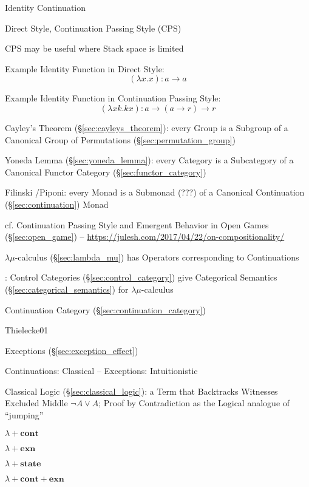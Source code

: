 Identity Continuation


\asterism


Direct Style, Continuation Passing Style (CPS)

CPS may be useful where Stack space is limited

Example Identity Function in Direct Style:
\[
  (\lambda x . x) : a \rightarrow a
\]

Example Identity Function in Continuation Passing Style:
\[
  (\lambda x k.k x) : a \rightarrow (a \rightarrow r) \rightarrow r
\]

Cayley's Theorem (\S\ref{sec:cayleys_theorem}): every Group is a Subgroup of a
Canonical Group of Permutations (\S\ref{sec:permutation_group})

Yoneda Lemma (\S\ref{sec:yoneda_lemma}): every Category is a Subcategory of a
Canonical Functor Category (\S\ref{sec:functor_category})

Filinski \cite{filinski99}/Piponi: every Monad is a Submonad (???) of a
Canonical Continuation (\S\ref{sec:continuation}) Monad

cf. Continuation Passing Style and Emergent Behavior in Open Games
(\S\ref{sec:open_game}) --
\url{https://julesh.com/2017/04/22/on-compositionality/}


\asterism


$\lambda\mu$-calculus (\S\ref{sec:lambda_mu}) has Operators corresponding to
Continuations

\cite{selinger01}: Control Categories (\S\ref{sec:control_category}) give
Categorical Semantics (\S\ref{sec:categorical_semantics}) for
$\lambda\mu$-calculus

Continuation Category (\S\ref{sec:continuation_category})


\asterism


Thielecke01 %

Exceptions (\S\ref{sec:exception_effect})

Continuations: Classical -- Exceptions: Intuitionistic

Classical Logic (\S\ref{sec:classical_logic}): a Term that Backtracks Witnesses
Excluded Middle $\neg A \vee A$; Proof by Contradiction as the Logical analogue
of ``jumping''

$\lambda + \mathbf{cont}$

$\lambda + \mathbf{exn}$

$\lambda + \mathbf{state}$

$\lambda + \mathbf{cont} + \mathbf{exn}$

